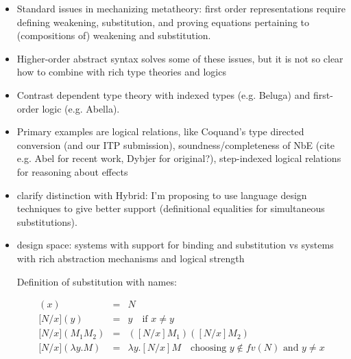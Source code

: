 \documentclass{article}
\begin{document}
\begin{itemize}
\item Standard issues in mechanizing metatheory: first order
  representations require defining weakening, substitution, and proving
  equations pertaining to (compositions of) weakening and
  substitution.
\item Higher-order abstract syntax solves some of these issues, but it
  is not so clear how to combine with rich type theories and logics
\item Contrast dependent type theory with indexed types (e.g. Beluga) and first-order
logic (e.g. Abella). 

\item Primary examples are logical relations, like Coquand's type
directed conversion (and our ITP submission), soundness/completeness of NbE
(cite e.g. Abel for recent work, Dybjer for original?),
step-indexed logical relations for reasoning about effects

\item clarify distinction with Hybrid: I'm proposing to use language design
techniques to give better support (definitional equalities for
simultaneous substitutions).

\item design space: systems with support for binding and substitution vs
systems with rich abstraction mechanisms and logical strength

Definition of substitution with names:

\begin{eqnarray*}
[N/x](x) & = & N \\
 \lbrack N/x](y) & = & y \quad \text{if $x \neq y$} \\
 \lbrack N/x](M_1 M_2) & = & ([N/x]M_1) ([N/x]M_2) \\
 \lbrack N/x](\lambda y. M) & = & \lambda y. [N/x]M \quad
 \text{choosing $y \not\in fv(N)$ and
  $y \neq x$}
\end{eqnarray*}





\end{itemize}
\end{document}
